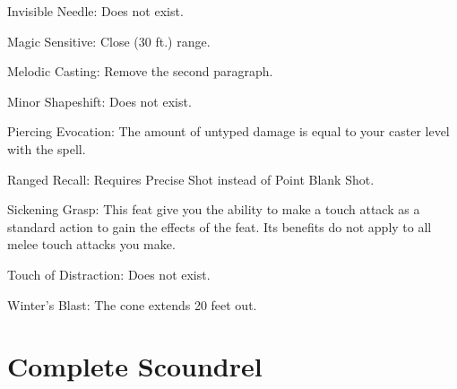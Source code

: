 \begin{itemize*}
\item Invisible Needle: Does not exist.
\item Magic Sensitive: Close (30 ft.) range.
\item Melodic Casting: Remove the second paragraph.
\item Minor Shapeshift: Does not exist.
\item Piercing Evocation: The amount of untyped damage is equal to your caster level with the spell.
\item Ranged Recall: Requires Precise Shot instead of Point Blank Shot.
\item Sickening Grasp: This feat give you the ability to make a touch attack as a standard action to gain the effects of the feat. Its benefits do not apply to all melee touch attacks you make.
\item Touch of Distraction: Does not exist.
\item Winter's Blast: The cone extends 20 feet out.
\end{itemize*}

\section{Complete Scoundrel}
